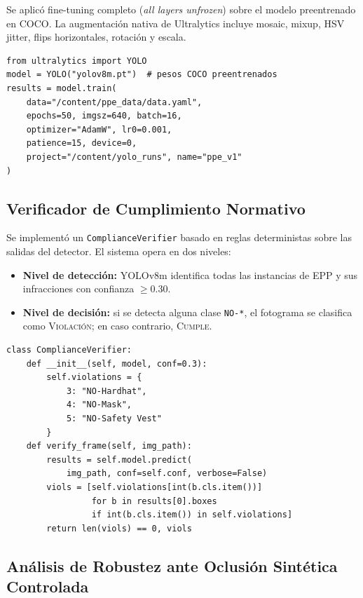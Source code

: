 \documentclass{article}
\begin{document}
Se aplicó fine-tuning completo (\emph{all layers unfrozen}) sobre el
modelo preentrenado en COCO. La augmentación nativa de Ultralytics incluye
mosaic, mixup, HSV jitter, flips horizontales, rotación y escala.

\begin{lstlisting}[caption={Entrenamiento YOLOv8m con Ultralytics.}]
from ultralytics import YOLO
model = YOLO("yolov8m.pt")  # pesos COCO preentrenados
results = model.train(
    data="/content/ppe_data/data.yaml",
    epochs=50, imgsz=640, batch=16,
    optimizer="AdamW", lr0=0.001,
    patience=15, device=0,
    project="/content/yolo_runs", name="ppe_v1"
)
\end{lstlisting}

\subsection{Verificador de Cumplimiento Normativo}

Se implementó un \texttt{ComplianceVerifier} basado en reglas
deterministas sobre las salidas del detector. El sistema opera en
dos niveles:

\begin{itemize}[itemsep=2pt]
  \item \textbf{Nivel de detección:} YOLOv8m identifica todas las
        instancias de EPP y sus infracciones con confianza $\geq 0.30$.
  \item \textbf{Nivel de decisión:} si se detecta alguna clase
        \texttt{NO-*}, el fotograma se clasifica como
        \textsc{Violación}; en caso contrario, \textsc{Cumple}.
\end{itemize}

\begin{lstlisting}[caption={Verificador de cumplimiento normativo.}]
class ComplianceVerifier:
    def __init__(self, model, conf=0.3):
        self.violations = {
            3: "NO-Hardhat",
            4: "NO-Mask",
            5: "NO-Safety Vest"
        }
    def verify_frame(self, img_path):
        results = self.model.predict(
            img_path, conf=self.conf, verbose=False)
        viols = [self.violations[int(b.cls.item())]
                 for b in results[0].boxes
                 if int(b.cls.item()) in self.violations]
        return len(viols) == 0, viols
\end{lstlisting}

\subsection{Análisis de Robustez ante Oclusión Sintética Controlada}
\end{document}
